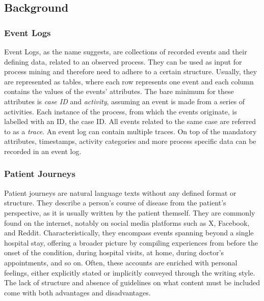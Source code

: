 \subsection{Background}\label{sec:back}
\subsubsection*{Event Logs}\label{sec:event-log}
Event Logs, as the name suggests, are collections of recorded events and their defining data, related to an observed process. They can be used as input for process mining and therefore need to adhere to a certain structure. Usually, they are represented as tables, where each row represents one event and each column contains the values of the events' attributes. The bare minimum for these attributes is \emph{case ID} and \emph{activity}, assuming an event is made from a series of activities. Each instance of the process, from which the events originate, is labelled with an ID, the case ID. All events related to the same case are referred to as a \emph{trace}. An event log can contain multiple traces. On top of the mandatory attributes, timestamps, activity categories and more process specific data can be recorded in an event log.~\cite{van_der_aalst_process_2016}

\subsubsection*{Patient Journeys}\label{sec:pj}
Patient journeys are natural language texts without any defined format or structure. They describe a person's course of disease from the patient's perspective, as it is usually written by the patient themself. They  are commonly found on the internet, notably on social media platforms such as X, Facebook, and Reddit. Characteristically, they encompass events spanning beyond a single hospital stay, offering a broader picture by compiling experiences from before the onset of the condition, during hospital visits, at home, during doctor's appointments, and so on. Often, these accounts are enriched with personal feelings, either explicitly stated or implicitly conveyed through the writing style. The lack of structure and absence of guidelines on what content must be included come with both advantages and disadvantages.

